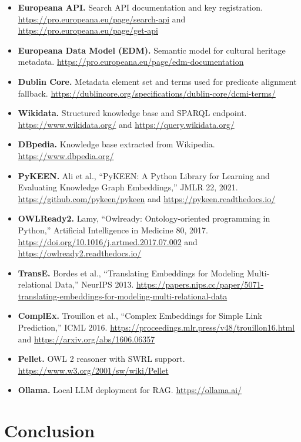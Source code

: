 \documentclass[11pt,a4paper]{article}
\begin{document}
  \begin{itemize}
  \item \textbf{Europeana API.} Search API documentation and key registration. \url{https://pro.europeana.eu/page/search-api} and \url{https://pro.europeana.eu/page/get-api}
  \item \textbf{Europeana Data Model (EDM).} Semantic model for cultural heritage metadata. \url{https://pro.europeana.eu/page/edm-documentation}
  \item \textbf{Dublin Core.} Metadata element set and terms used for predicate alignment fallback. \url{https://dublincore.org/specifications/dublin-core/dcmi-terms/}
  \item \textbf{Wikidata.} Structured knowledge base and SPARQL endpoint. \url{https://www.wikidata.org/} and \url{https://query.wikidata.org/}
  \item \textbf{DBpedia.} Knowledge base extracted from Wikipedia. \url{https://www.dbpedia.org/}
  \item \textbf{PyKEEN.} Ali et al., ``PyKEEN: A Python Library for Learning and Evaluating Knowledge Graph Embeddings,'' JMLR 22, 2021. \url{https://github.com/pykeen/pykeen} and \url{https://pykeen.readthedocs.io/}
  \item \textbf{OWLReady2.} Lamy, ``Owlready: Ontology-oriented programming in Python,'' Artificial Intelligence in Medicine 80, 2017. \url{https://doi.org/10.1016/j.artmed.2017.07.002} and \url{https://owlready2.readthedocs.io/}
  \item \textbf{TransE.} Bordes et al., ``Translating Embeddings for Modeling Multi-relational Data,'' NeurIPS 2013. \url{https://papers.nips.cc/paper/5071-translating-embeddings-for-modeling-multi-relational-data}
  \item \textbf{ComplEx.} Trouillon et al., ``Complex Embeddings for Simple Link Prediction,'' ICML 2016. \url{https://proceedings.mlr.press/v48/trouillon16.html} and \url{https://arxiv.org/abs/1606.06357}
  \item \textbf{Pellet.} OWL 2 reasoner with SWRL support. \url{https://www.w3.org/2001/sw/wiki/Pellet}
  \item \textbf{Ollama.} Local LLM deployment for RAG. \url{https://ollama.ai/}
  \end{itemize}

  \section{Conclusion}
\end{document}
